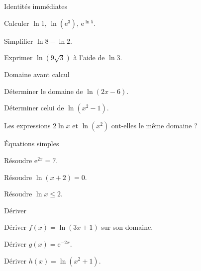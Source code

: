 \exercices
{}
\begingroup\renewcommand{\otBesoinPlace}[1]{}\begin{minipage}{\linewidth}
\begin{exercice}[1]{Identités immédiates}

\begin{questions}
\item Calculer $\ln1$, $\ln(\mathrm e^3)$, $\mathrm e^{\ln5}$.
\item Simplifier $\ln8-\ln2$.
\item Exprimer $\ln(9\sqrt3)$ à l’aide de $\ln3$.
\end{questions}
\end{exercice}
\begin{exercice}[1]{Domaine avant calcul}

\begin{questions}
\item Déterminer le domaine de $\ln(2x-6)$.
\item Déterminer celui de $\ln(x^2-1)$.
\item Les expressions $2\ln x$ et $\ln(x^2)$ ont-elles le même domaine ?
\end{questions}
\end{exercice}
\begin{exercice}[1]{Équations simples}

\begin{questions}
\item Résoudre $\mathrm e^{2x}=7$.
\item Résoudre $\ln(x+2)=0$.
\item Résoudre $\ln x\leq2$.
\end{questions}
\end{exercice}
\begin{exercice}[1]{Dériver}

\begin{questions}
\item Dériver $f(x)=\ln(3x+1)$ sur son domaine.
\item Dériver $g(x)=\mathrm e^{-2x}$.
\item Dériver $h(x)=\ln(x^2+1)$.
\end{questions}
\end{exercice}
\end{minipage}\endgroup
\clearpage
{}
